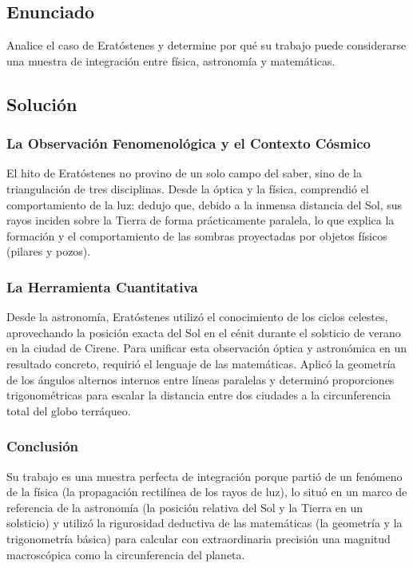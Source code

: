 \documentclass[12pt, a4paper]{article}
\begin{document}
\newpage

\subsection*{Enunciado}
Analice el caso de Eratóstenes y determine por qué su trabajo puede considerarse una muestra de integración entre física, astronomía y matemáticas.

\subsection*{Solución}

\subsubsection*{La Observación Fenomenológica y el Contexto Cósmico}
El hito de Eratóstenes no provino de un solo campo del saber, sino de la triangulación de tres disciplinas. Desde la óptica y la física, comprendió el comportamiento de la luz: dedujo que, debido a la inmensa distancia del Sol, sus rayos inciden sobre la Tierra de forma prácticamente paralela, lo que explica la formación y el comportamiento de las sombras proyectadas por objetos físicos (pilares y pozos). 

\subsubsection*{La Herramienta Cuantitativa}
Desde la astronomía, Eratóstenes utilizó el conocimiento de los ciclos celestes, aprovechando la posición exacta del Sol en el cénit durante el solsticio de verano en la ciudad de Cirene. Para unificar esta observación óptica y astronómica en un resultado concreto, requirió el lenguaje de las matemáticas. Aplicó la geometría de los ángulos alternos internos entre líneas paralelas y determinó proporciones trigonométricas para escalar la distancia entre dos ciudades a la circunferencia total del globo terráqueo.

\subsubsection*{Conclusión}
Su trabajo es una muestra perfecta de integración porque partió de un fenómeno de la física (la propagación rectilínea de los rayos de luz), lo situó en un marco de referencia de la astronomía (la posición relativa del Sol y la Tierra en un solsticio) y utilizó la rigurosidad deductiva de las matemáticas (la geometría y la trigonometría básica) para calcular con extraordinaria precisión una magnitud macroscópica como la circunferencia del planeta.
\end{document}
